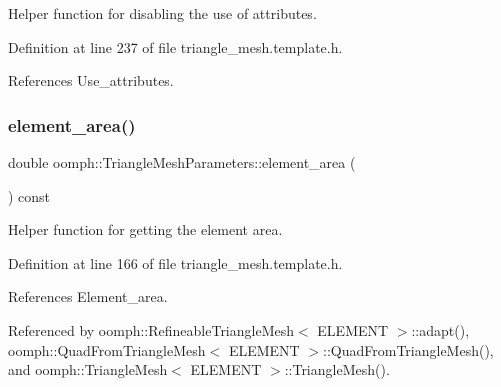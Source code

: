 Helper function for disabling the use of attributes. 



Definition at line 237 of file triangle\+\_\+mesh.\+template.\+h.



References Use\+\_\+attributes.

\mbox{\label{classoomph_1_1TriangleMeshParameters_a58761d517c8e5721bcba9bdd0ffcda7c}} 
\subsubsection{\texorpdfstring{element\+\_\+area()}{element\_area()}\hspace{0.1cm}{\footnotesize\ttfamily [1/2]}}
{\footnotesize\ttfamily double oomph\+::\+Triangle\+Mesh\+Parameters\+::element\+\_\+area (\begin{DoxyParamCaption}{ }\end{DoxyParamCaption}) const\hspace{0.3cm}{\ttfamily [inline]}}



Helper function for getting the element area. 



Definition at line 166 of file triangle\+\_\+mesh.\+template.\+h.



References Element\+\_\+area.



Referenced by oomph\+::\+Refineable\+Triangle\+Mesh$<$ E\+L\+E\+M\+E\+N\+T $>$\+::adapt(), oomph\+::\+Quad\+From\+Triangle\+Mesh$<$ E\+L\+E\+M\+E\+N\+T $>$\+::\+Quad\+From\+Triangle\+Mesh(), and oomph\+::\+Triangle\+Mesh$<$ E\+L\+E\+M\+E\+N\+T $>$\+::\+Triangle\+Mesh().

\mbox{\label{classoomph_1_1TriangleMeshParameters_a4a23f9e7dbbde6422d7a1fa117942093}} 
